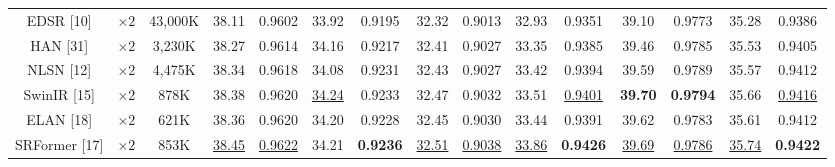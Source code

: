 \documentclass{ieeeaccess}
\begin{document}
\begin{table}
\begin{tabular}{|c|c|c|cc|cc|cc|cc|cc|cc|}

EDSR [10] & $\times 2$&43,000K& \multicolumn{1}{c|}{38.11} & 0.9602 & \multicolumn{1}{c|}{33.92} & 0.9195  &\multicolumn{1}{c|}{32.32} & 0.9013 & \multicolumn{1}{c|}{32.93} & 0.9351  & \multicolumn{1}{c|}{39.10} & 0.9773
&\multicolumn{1}{c|}{35.28} &0.9386\\

HAN [31] & $\times 2$&3,230K& \multicolumn{1}{c|}{38.27} & 0.9614  & \multicolumn{1}{c|}{34.16} & 0.9217  &\multicolumn{1}{c|}{32.41} & 0.9027 & \multicolumn{1}{c|}{33.35} &0.9385& \multicolumn{1}{c|}{39.46} & 0.9785
&\multicolumn{1}{c|}{35.53} &0.9405\\

NLSN [12] & $\times 2$ &4,475K& \multicolumn{1}{c|}{38.34} & 0.9618 & \multicolumn{1}{c|}{34.08} & 0.9231 & \multicolumn{1}{c|}{32.43} & 0.9027 & \multicolumn{1}{c|}{33.42} &0.9394 & \multicolumn{1}{c|}{39.59} & 0.9789
&\multicolumn{1}{c|}{35.57} & 0.9412\\

SwinIR [15] & $\times 2$ &878K& \multicolumn{1}{c|}{38.38} & {0.9620} & \multicolumn{1}{c|}{\color{blue}\underline{34.24}} &{ 0.9233} & \multicolumn{1}{c|}{32.47} & {0.9032} & \multicolumn{1}{c|}{33.51} & {\color{blue}\underline{0.9401}} & \multicolumn{1}{c|}{\color{red}\textbf{39.70}} &{\color{red}\textbf{0.9794}} &\multicolumn{1}{c|}{35.66} & {\color{blue}\underline{ 0.9416}}\\

ELAN [18] & $\times 2$ &621K& \multicolumn{1}{c|}{38.36} & 0.9620 & \multicolumn{1}{c|}{34.20} & 0.9228 & \multicolumn{1}{c|}{32.45} & 0.9030 & \multicolumn{1}{c|}{33.44} &0.9391 & \multicolumn{1}{c|}{39.62} & 0.9783
&\multicolumn{1}{c|}{35.61} & 0.9412\\

SRFormer [17] & $\times 2$ &853K& \multicolumn{1}{c|}{\color{blue}\underline{38.45}} & {\color{blue}\underline{0.9622}} & \multicolumn{1}{c|}{34.21} &{\color{red}\textbf{ 0.9236}} & \multicolumn{1}{c|}{\color{blue}\underline{32.51}} & {\color{blue}\underline{0.9038}} & \multicolumn{1}{c|}{\color{blue}\underline{33.86}} & {\color{red}\textbf{0.9426}} & \multicolumn{1}{c|}{\color{blue}\underline{39.69}} & {\color{blue}\underline{0.9786}} &\multicolumn{1}{c|}{\color{blue}\underline{35.74}} & {\color{red}\textbf{ 0.9422}}\\


\end{tabular}
\end{table}
\end{document}
